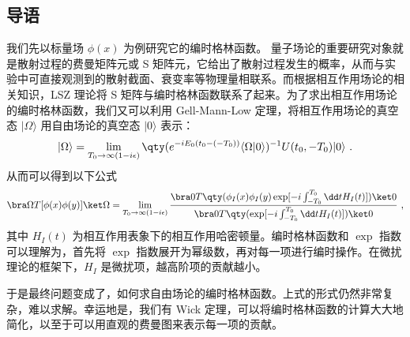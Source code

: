 
\subsection{导语}
我们先以标量场 $\phi(x)$ 为例研究它的编时格林函数。
量子场论的重要研究对象就是散射过程的费曼矩阵元或 S 矩阵元，它给出了散射过程发生的概率，从而与实验中可直接观测到的散射截面、衰变率等物理量相联系。而根据相互作用场论的相关知识，LSZ 理论将 S 矩阵与编时格林函数联系了起来。为了求出相互作用场论的编时格林函数，我们又可以利用 Gell-Mann-Low 定理，将相互作用场论的真空态 $|\Omega\rangle$ 用自由场论的真空态 $|0\rangle$ 表示：
\begin{equation}
|\Omega\rangle = \lim\limits_{T_0\rightarrow \infty(1-i\epsilon)}\qty(e^{-iE_0(t_0-(-T_0))}\langle \Omega|0\rangle )^{-1}U(t_0,-T_0)|0\rangle~.
\end{equation}
从而可以得到以下公式
\begin{equation}\label{eq_wick_1}
\bra\Omega T[\phi(x)\phi(y)]\ket\Omega = \lim\limits_{T_0\rightarrow \infty(1-i\epsilon)}\frac{\bra 0 T\qty(\phi_I(x)\phi_I(y)\exp[-i\int_{-T_0}^{T_0}\dd t H_I(t)])\ket 0}{\bra 0 T\qty(\exp[-i\int_{-T_0}^{T_0}\dd t H_I(t)])\ket 0}~,
\end{equation}
其中 $H_I(t)$ 为相互作用表象下的相互作用哈密顿量。编时格林函数和 $\exp$ 指数可以理解为，首先将 $\exp$ 指数展开为幂级数，再对每一项进行编时操作。在微扰理论的框架下，$H_I$ 是微扰项，越高阶项的贡献越小。

于是最终问题变成了，如何求自由场论的编时格林函数。上式的形式仍然非常复杂，难以求解。幸运地是，我们有 Wick 定理，可以将编时格林函数的计算大大地简化，以至于可以用直观的费曼图来表示每一项的贡献。
